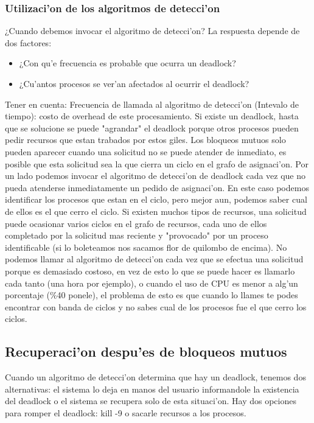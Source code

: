 \documentclass[a4paper,10pt]{article}
\begin{document}
\subsubsection{Utilizaci'on de los algoritmos de detecci'on}
¿Cuando debemos invocar el algoritmo de detecci'on? La respuesta depende de dos factores:
\begin{itemize}
 \item ¿Con qu'e frecuencia es probable que ocurra un deadlock?
 \item ¿Cu'antos procesos se ver'an afectados al ocurrir el deadlock?
\end{itemize}
Tener en cuenta:
Frecuencia de llamada al algoritmo de detecci'on (Intevalo de tiempo): costo de overhead de este procesamiento.
Si existe un deadlock, hasta que se solucione se puede "agrandar" el deadlock porque otros procesos pueden pedir recursos que estan trabados por estos giles.
Los bloqueos mutuos solo pueden aparecer cuando una solicitud no se puede atender de inmediato, es posible que esta solicitud sea la que cierra un ciclo en el grafo de asignaci'on. Por un lado podemos invocar el algoritmo de detecci'on de deadlock cada vez que no pueda atenderse inmediatamente un pedido de asignaci'on. En este caso podemos identificar los procesos que estan en el ciclo, pero mejor aun, podemos saber cual de ellos es el que cerro el ciclo. Si existen muchos tipos de recursos, una solicitud puede ocasionar varios ciclos en el grafo de recursos, cada uno de ellos completado por la solicitud mas reciente y "provocado" por un proceso identificable (si lo boleteamos nos sacamos flor de quilombo de encima).
No podemos llamar al algoritmo de detecci'on cada vez que se efectua una solicitud porque es demasiado costoso, en vez de esto lo que se puede hacer es llamarlo cada tanto (una hora por ejemplo), o cuando el uso de CPU es menor a alg'un porcentaje (\%40 ponele), el problema de esto es que cuando lo llames te podes encontrar con banda de ciclos y no sabes cual de los procesos fue el que cerro los ciclos.
 
\subsection{Recuperaci'on despu'es de bloqueos mutuos}
Cuando un algoritmo de detecci'on determina que hay un deadlock, tenemos dos alternativas: el sistema lo deja en manos del usuario informandole la existencia del deadlock o el sistema se recupera solo de esta situaci'on.
Hay dos opciones para romper el deadlock: kill -9 o sacarle recursos a los procesos.
\end{document}
